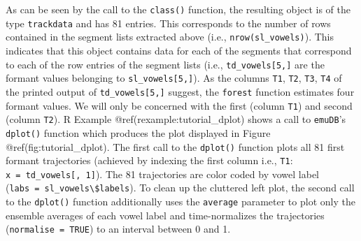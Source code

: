 \documentclass[]{book}
\newenvironment{Shaded}{\begin{snugshade}}{\end{snugshade}}
\newcommand{\KeywordTok}[1]{\textcolor[rgb]{0.13,0.29,0.53}{\textbf{{#1}}}}
\newcommand{\DataTypeTok}[1]{\textcolor[rgb]{0.13,0.29,0.53}{{#1}}}
\newcommand{\DecValTok}[1]{\textcolor[rgb]{0.00,0.00,0.81}{{#1}}}
\newcommand{\StringTok}[1]{\textcolor[rgb]{0.31,0.60,0.02}{{#1}}}
\newcommand{\CommentTok}[1]{\textcolor[rgb]{0.56,0.35,0.01}{\textit{{#1}}}}
\newcommand{\OtherTok}[1]{\textcolor[rgb]{0.56,0.35,0.01}{{#1}}}
\newcommand{\NormalTok}[1]{{#1}}
\theoremstyle{definition}
\theoremstyle{definition}
\theoremstyle{definition}
\theoremstyle{remark}
\begin{document}
As can be seen by the call to the \texttt{class()} function, the
resulting object is of the type \texttt{trackdata} and has 81 entries.
This corresponds to the number of rows contained in the segment lists
extracted above (i.e., \texttt{nrow(sl\_vowels)}). This indicates that
this object contains data for each of the segments that correspond to
each of the row entries of the segment lists (i.e.,
\texttt{td\_vowels{[}5,{]}} are the formant values belonging to
\texttt{sl\_vowels{[}5,{]}}). As the columns \texttt{T1}, \texttt{T2},
\texttt{T3}, \texttt{T4} of the printed output of
\texttt{td\_vowels{[}5,{]}} suggest, the \texttt{forest} function
estimates four formant values. We will only be concerned with the first
(column \texttt{T1}) and second (column \texttt{T2}). R Example
@ref(rexample:tutorial\_dplot) shows a call to \texttt{emuDB}'s
\texttt{dplot()} function which produces the plot displayed in Figure
@ref(fig:tutorial\_dplot). The first call to the \texttt{dplot()}
function plots all 81 first formant trajectories (achieved by indexing
the first column i.e., \texttt{T1}:
\texttt{x\ =\ td\_vowels{[},\ 1{]}}). The 81 trajectories are color
coded by vowel label
(\texttt{labs\ =\ sl\_vowels\textbackslash{}\$labels}). To clean up the
cluttered left plot, the second call to the \texttt{dplot()} function
additionally uses the \texttt{average} parameter to plot only the
ensemble averages of each vowel label and time-normalizes the
trajectories (\texttt{normalise\ =\ TRUE}) to an interval between 0 and
1.

\begin{Shaded}
\end{Shaded}
\end{document}
